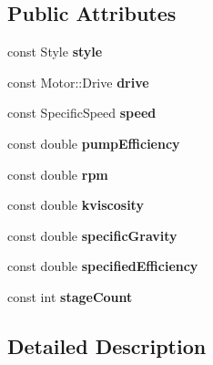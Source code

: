 \subsection*{Public Attributes}
\begin{DoxyCompactItemize}
\item 
\mbox{\label{struct_pump_1_1_input_aca184aaaa02b4e497dccec206f96a0d0}} 
const Style {\bfseries style}
\item 
\mbox{\label{struct_pump_1_1_input_ad14338611cfbf4fc0a0100d668c16f32}} 
const Motor\+::\+Drive {\bfseries drive}
\item 
\mbox{\label{struct_pump_1_1_input_a897d65dbfaddfd286aac0dd0dd88fcb6}} 
const Specific\+Speed {\bfseries speed}
\item 
\mbox{\label{struct_pump_1_1_input_a08d04fac4f8e9ac820bf252bce50c478}} 
const double {\bfseries pump\+Efficiency}
\item 
\mbox{\label{struct_pump_1_1_input_a90b8725d1063cd958f89ed86ea174ab0}} 
const double {\bfseries rpm}
\item 
\mbox{\label{struct_pump_1_1_input_a7a1be3b4723aa2f49e5fdcbcc274d0c9}} 
const double {\bfseries kviscosity}
\item 
\mbox{\label{struct_pump_1_1_input_a1608eb0dfdd429df17ea7eddc55ccad7}} 
const double {\bfseries specific\+Gravity}
\item 
\mbox{\label{struct_pump_1_1_input_ab3b05426735a030d782ed1e7b41502c0}} 
const double {\bfseries specified\+Efficiency}
\item 
\mbox{\label{struct_pump_1_1_input_a0bb32e194fea939f8ef8cc74f6dccc4b}} 
const int {\bfseries stage\+Count}
\end{DoxyCompactItemize}


\subsection{Detailed Description}


